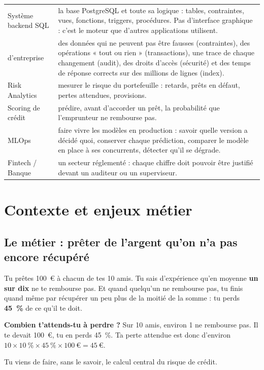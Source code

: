\begin{center}\small
\begin{tabularx}{\linewidth}{@{}B{3.6cm} L@{}}
\toprule
Système backend SQL & la base PostgreSQL et toute sa logique : tables, contraintes, vues, fonctions,
triggers, procédures. Pas d'interface graphique : c'est le moteur que d'autres applications utilisent. \\
d'entreprise & des données qui ne peuvent pas être fausses (contraintes), des opérations « tout ou
rien » (transactions), une trace de chaque changement (audit), des droits d'accès (sécurité) et des
temps de réponse corrects sur des millions de lignes (index). \\
Risk Analytics & mesurer le risque du portefeuille : retards, prêts en défaut, pertes attendues,
provisions. \\
Scoring de crédit & prédire, avant d'accorder un prêt, la probabilité que l'emprunteur ne rembourse pas. \\
MLOps & faire vivre les modèles en production : savoir quelle version a décidé quoi, conserver chaque
prédiction, comparer le modèle en place à ses concurrents, détecter qu'il se dégrade. \\
Fintech / Banque & un secteur réglementé : chaque chiffre doit pouvoir être justifié devant un
auditeur ou un superviseur. \\
\bottomrule
\end{tabularx}
\end{center}

\section{Contexte et enjeux métier}

\subsection{Le métier : prêter de l'argent qu'on n'a pas encore récupéré}

\begin{imagine}
Tu prêtes 100~€ à chacun de tes 10 amis. Tu sais d'expérience qu'en moyenne \textbf{un sur dix} ne te
rembourse pas. Et quand quelqu'un ne rembourse pas, tu finis quand même par récupérer un peu plus de la
moitié de la somme : tu perds \textbf{45~\%} de ce qu'il te doit.

\textbf{Combien t'attends-tu à perdre ?} Sur 10 amis, environ 1 ne rembourse pas. Il te devait 100~€, tu
en perds 45~\%. Ta perte attendue est donc d'environ $10 \times 10~\% \times 45~\% \times 100~€ = 45~€$.

Tu viens de faire, sans le savoir, le calcul central du risque de crédit.
\end{imagine}

